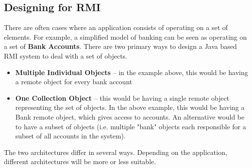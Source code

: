 \documentclass{article}
\begin{document}
\subsection{Designing for RMI}

There are often cases where an application consists of operating on a set of elements. For example, a simplified model of banking can be seen as operating on a set of \textbf{Bank Accounts}. There are two primary ways to design a Java based RMI system to deal with a set of objects.

\begin{itemize}
    \item \textbf{Multiple Individual Objects} -- in the example above, this would be having a remote object for every bank account
    \item \textbf{One Collection Object} -- this would be having a single remote object representing the set of objects. In the above example, this would be having a Bank remote object, which gives access to accounts. An alternative would be to have a subset of objects (i.e. multiple "bank" objects each responsible for a subset of all accounts in the system).
\end{itemize}

The two architectures differ in several ways. Depending on the application, different architectures will be more or less suitable. 
\end{document}
